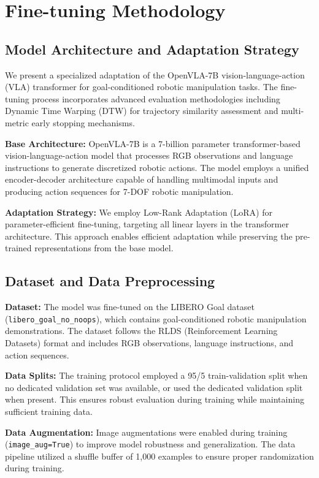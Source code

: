 \section{Fine-tuning Methodology}

\subsection{Model Architecture and Adaptation Strategy}

We present a specialized adaptation of the OpenVLA-7B vision-language-action (VLA) transformer for goal-conditioned robotic manipulation tasks. The fine-tuning process incorporates advanced evaluation methodologies including Dynamic Time Warping (DTW) for trajectory similarity assessment and multi-metric early stopping mechanisms.

\textbf{Base Architecture:} OpenVLA-7B is a 7-billion parameter transformer-based vision-language-action model that processes RGB observations and language instructions to generate discretized robotic actions. The model employs a unified encoder-decoder architecture capable of handling multimodal inputs and producing action sequences for 7-DOF robotic manipulation.

\textbf{Adaptation Strategy:} We employ Low-Rank Adaptation (LoRA) \cite{hu2021lora} for parameter-efficient fine-tuning, targeting all linear layers in the transformer architecture. This approach enables efficient adaptation while preserving the pre-trained representations from the base model.

\subsection{Dataset and Data Preprocessing}

\textbf{Dataset:} The model was fine-tuned on the LIBERO Goal dataset (\texttt{libero\_goal\_no\_noops}), which contains goal-conditioned robotic manipulation demonstrations. The dataset follows the RLDS (Reinforcement Learning Datasets) format and includes RGB observations, language instructions, and action sequences.

\textbf{Data Splits:} The training protocol employed a 95/5 train-validation split when no dedicated validation set was available, or used the dedicated validation split when present. This ensures robust evaluation during training while maintaining sufficient training data.

\textbf{Data Augmentation:} Image augmentations were enabled during training (\texttt{image\_aug=True}) to improve model robustness and generalization. The data pipeline utilized a shuffle buffer of 1,000 examples to ensure proper randomization during training.

